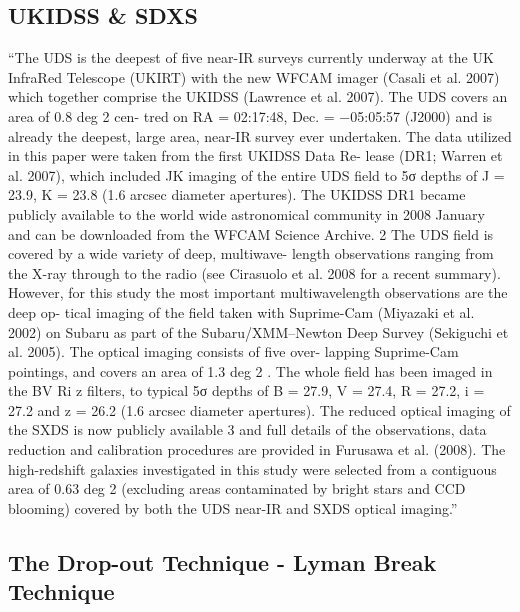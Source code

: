 \documentclass[manuscript]{aastex}
\begin{document}
  \subsection{UKIDSS \& SDXS}
    ``The UDS is the deepest of five near-IR surveys currently underway
      at the UK InfraRed Telescope (UKIRT) with the new WFCAM
      imager (Casali et al. 2007) which together comprise the UKIDSS
      (Lawrence et al. 2007). The UDS covers an area of 0.8 deg 2 cen-
      tred on RA = 02:17:48, Dec. = −05:05:57 (J2000) and is already
      the deepest, large area, near-IR survey ever undertaken. The data
      utilized in this paper were taken from the first UKIDSS Data Re-
      lease (DR1; Warren et al. 2007), which included JK imaging of the
      entire UDS field to 5σ depths of J = 23.9, K = 23.8 (1.6 arcsec
      diameter apertures). The UKIDSS DR1 became publicly available
      to the world wide astronomical community in 2008 January and can
      be downloaded from the WFCAM Science Archive. 2
      The UDS field is covered by a wide variety of deep, multiwave-
      length observations ranging from the X-ray through to the radio (see
      Cirasuolo et al. 2008 for a recent summary). However, for this study
      the most important multiwavelength observations are the deep op-
      tical imaging of the field taken with Suprime-Cam (Miyazaki et al.
      2002) on Subaru as part of the Subaru/XMM–Newton Deep Survey
      (Sekiguchi et al. 2005). The optical imaging consists of five over-
      lapping Suprime-Cam pointings, and covers an area of 1.3 deg 2 .
      The whole field has been imaged in the BV Ri z filters, to typical
      5σ depths of B = 27.9, V = 27.4, R = 27.2, i = 27.2 and z = 26.2
      (1.6 arcsec diameter apertures). The reduced optical imaging of the
      SXDS is now publicly available 3 and full details of the observations,
      data reduction and calibration procedures are provided in Furusawa
      et al. (2008). The high-redshift galaxies investigated in this study
      were selected from a contiguous area of 0.63 deg 2 (excluding areas
      contaminated by bright stars and CCD blooming) covered by both
      the UDS near-IR and SXDS optical imaging.'' \cite{mclure09}



\subsection{The Drop-out Technique - Lyman Break Technique}

\cite{steidel03}
\end{document}
